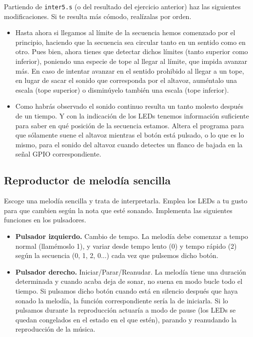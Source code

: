 Partiendo de {\tt inter5.s} (o del resultado del ejercicio anterior) haz las siguientes
modificaciones. Si te resulta más cómodo, realízalas por orden.

\begin{itemize}
  \item Hasta ahora si llegamos al límite de la secuencia hemos comenzado por el principio,
        haciendo que la secuencia sea circular tanto en un sentido como en otro. Pues bien,
        ahora tienes que detectar dichos límites (tanto superior como inferior), poniendo
        una especie de tope al llegar al límite, que impida avanzar más. En caso de intentar
        avanzar en el sentido prohibido al llegar a un tope, en lugar de sacar el sonido que
        corresponda por el altavoz, auméntalo una escala (tope superior) o disminúyelo también
        una escala (tope inferior).
  \item Como habrás observado el sonido continuo resulta un tanto molesto después de un tiempo.
        Y con la indicación de los LEDs tenemos información suficiente para saber en qué
        posición de la secuencia estamos. Altera el programa para que sólamente suene el altavoz
        mientras el botón está pulsado, o lo que es lo mismo, para el sonido del altavoz cuando
        detectes un flanco de bajada en la señal GPIO correspondiente.
\end{itemize}

\subsection{Reproductor de melodía sencilla}

Escoge una melodía sencilla y trata de interpretarla. Emplea los LEDs a tu gusto para que
cambien según la nota que esté sonando. Implementa las siguientes funciones en los pulsadores.

\begin{itemize}
  \item \textbf{Pulsador izquierdo.} Cambio de tempo. La melodía debe comenzar a tempo normal (llamémoslo 1),
        y variar desde tempo lento (0) y tempo rápido (2) según la secuencia (0, 1, 2, 0...) cada
        vez que pulsemos dicho botón.
  \item \textbf{Pulsador derecho.} Iniciar/Parar/Reanudar. La melodía tiene una duración determinada y
        cuando acaba deja de sonar, no suena en modo bucle todo el tiempo. Si pulsamos dicho botón
        cuando está en silencio después que haya sonado la melodía, la función correspondiente
        sería la de iniciarla. Si lo pulsamos durante la reproducción actuaría a modo de pause
        (los LEDs se quedan congelados en el estado en el que estén), parando y reanudando la
        reproducción de la música.
\end{itemize}

